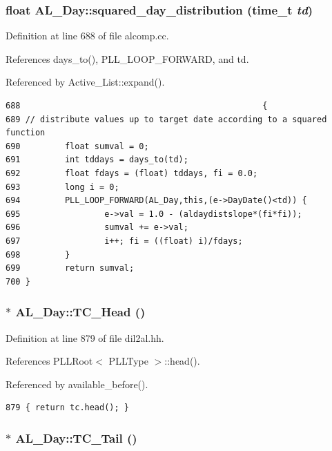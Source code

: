 \subsubsection{\setlength{\rightskip}{0pt plus 5cm}float AL\_\-Day::squared\_\-day\_\-distribution (time\_\-t {\em td})}\label{classAL__Day_a27}




Definition at line 688 of file alcomp.cc.

References days\_\-to(), PLL\_\-LOOP\_\-FORWARD, and td.

Referenced by Active\_\-List::expand().



\footnotesize\begin{verbatim}688                                                 {
689 // distribute values up to target date according to a squared function
690         float sumval = 0;
691         int tddays = days_to(td);
692         float fdays = (float) tddays, fi = 0.0;
693         long i = 0;
694         PLL_LOOP_FORWARD(AL_Day,this,(e->DayDate()<td)) {
695                 e->val = 1.0 - (aldaydistslope*(fi*fi));
696                 sumval += e->val;
697                 i++; fi = ((float) i)/fdays;
698         }
699         return sumval;
700 }
\end{verbatim}\normalsize 
{}
\subsubsection{$\ast$ AL\_\-Day::TC\_\-Head ()\hspace{0.3cm}{\tt  [inline]}}\label{classAL__Day_a10}




Definition at line 879 of file dil2al.hh.

References PLLRoot$<$ PLLType $>$::head().

Referenced by available\_\-before().



\footnotesize\begin{verbatim}879 { return tc.head(); }
\end{verbatim}\normalsize 
{}
\subsubsection{$\ast$ AL\_\-Day::TC\_\-Tail ()\hspace{0.3cm}{\tt  [inline]}}\label{classAL__Day_a11}





